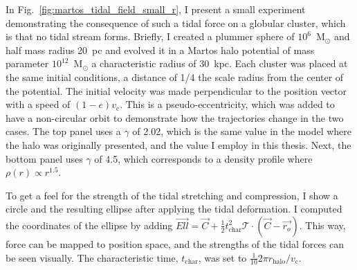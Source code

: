             In Fig.~\ref{fig:martos_tidal_field_small_r}, I present a small experiment demonstrating the consequence of such a tidal force on a globular cluster, which is that no tidal stream forms. Briefly, I created a plummer sphere of $10^6$~M$_\odot$ and half mass radius 20~pc and evolved it in a Martos halo potential of mass parameter $10^{12}$~M$_\odot$ a characteristic radius of $30$~kpc. Each cluster was placed at the same initial conditions, a distance of 1/4 the scale radius from the center of the potential. The initial velocity was made perpendicular to the position vector with a speed of $(1-e)v_\textrm{c}$. This is a pseudo-eccentricity, which was added to have a non-circular orbit to demonstrate how the trajectories change in the two cases. The top panel uses a $\gamma$ of 2.02, which is the same value in the model where the halo was originally presented, and the value I employ in this thesis. Next, the bottom panel uses $\gamma$ of 4.5, which corresponds to a density profile where $\rho(r) \propto r^{1.5}$. 

            To get a feel for the strength of the tidal stretching and compression, I show a circle and the resulting ellipse after applying the tidal deformation. I computed the coordinates of the ellipse by adding $\vec{Ell} = \vec{C} + \frac{1}{2} t_\textrm{char}^2 \mathcal{T}\cdot \left(\vec{C} - \vec{r_o}\right)$. This way, force can be mapped to position space, and the strengths of the tidal forces can be seen visually. The characteristic time, $t_\textrm{char}$, was set to $\frac{1}{10} 2\pi r_\textrm{halo} / v_\textrm{c}$. 
            
